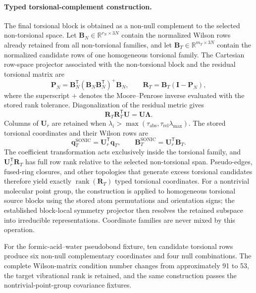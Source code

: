 \documentclass[journal=jctcce,manuscript=article,layout=traditional]{achemso}
\newcommand{\Bmat}{\mathbf{B}}
\newcommand{\q}{\mathbf{q}}
\theoremstyle{definition}
\begin{document}
{\color{red}
\paragraph{Typed torsional-complement construction.}
The final torsional block is obtained as a non-null complement to the selected
non-torsional space.  Let \(\Bmat_N\in\mathbb{R}^{r_N\times 3N}\) contain the
normalized Wilson rows already retained from all non-torsional families, and
let \(\Bmat_T\in\mathbb{R}^{m_T\times 3N}\) contain the normalized candidate
rows of one homogeneous torsional family.  The Cartesian row-space projector
associated with the non-torsional block and the residual torsional matrix are
\begin{equation}
  \mathbf{P}_N=
  \Bmat_N^{\mathsf T}
  (\Bmat_N\Bmat_N^{\mathsf T})^{+}\Bmat_N,
  \qquad
  \mathbf{R}_T=\Bmat_T(\mathbf{I}-\mathbf{P}_N),
  \label{eq:torsional-complement-projector}
\end{equation}
where the superscript \(+\) denotes the Moore--Penrose inverse evaluated with
the stored rank tolerance.  Diagonalization of the residual metric gives
\begin{equation}
  \mathbf{R}_T\mathbf{R}_T^{\mathsf T}\mathbf{U}
  =\mathbf{U}\boldsymbol{\Lambda}.
  \label{eq:torsional-complement-metric}
\end{equation}
Columns of \(\mathbf{U}_r\) are retained when
\(\lambda_i>\max(\tau_{\mathrm{abs}},
\tau_{\mathrm{rel}}\lambda_{\max})\).  The stored torsional coordinates and
their Wilson rows are
\begin{equation}
  \q_T^{\mathrm{SONIC}}=\mathbf{U}_r^{\mathsf T}\q_T,
  \qquad
  \Bmat_T^{\mathrm{SONIC}}=\mathbf{U}_r^{\mathsf T}\Bmat_T.
  \label{eq:torsional-complement-coordinates}
\end{equation}
The coefficient transformation acts exclusively inside the torsional family,
and \(\mathbf{U}_r^{\mathsf T}\mathbf{R}_T\) has full row rank relative to the
selected non-torsional span.  Pseudo-edges, fused-ring closures, and other
topologies that generate excess torsional candidates therefore yield exactly
\(\operatorname{rank}(\mathbf{R}_T)\) typed torsional coordinates.  For a
nontrivial molecular point group, the construction is applied to homogeneous
torsional source blocks using the stored atom permutations and orientation
signs; the established block-local symmetry projector then resolves the
retained subspace into irreducible representations.  Coordinate families are
never mixed by this operation.

For the formic-acid--water pseudobond fixture, ten candidate torsional rows
produce six non-null complementary coordinates and four null combinations.
The complete Wilson-matrix condition number changes from approximately 91 to
53, the target vibrational rank is retained, and the same construction passes
the nontrivial-point-group covariance fixtures.
}
\end{document}

